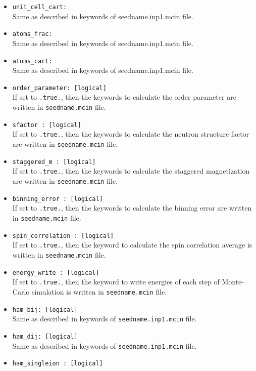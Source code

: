 \documentclass[10pt]{report}
\begin{document}
\begin{itemize}
\item {\tt unit\_cell\_cart: }               \\
Same as described in keywords of seedname.inp1.mcin file.
\item {\tt atoms\_frac: }                      \\
Same as described in keywords of seedname.inp1.mcin file.
\item {\tt atoms\_cart: }                      \\
Same as described in keywords of seedname.inp1.mcin file.
\item {\tt order\_parameter: [logical]}  \\
If set to {\tt .true.}, then the keywords to calculate the order parameter
 are written in {\tt seedname.mcin} file.
\item {\tt sfactor : [logical]}\\
If set to {\tt .true.}, then the keywords to calculate the neutron structure factor        
 are written in {\tt seedname.mcin} file.
\item {\tt staggered\_m : [logical]}\\
If set to {\tt .true.}, then the keywords to calculate the staggered magnetization
 are written in {\tt seedname.mcin} file.
\item {\tt binning\_error : [logical]}\\
If set to {\tt .true.}, then the keywords to calculate the binning error
 are written in {\tt seedname.mcin} file.
\item {\tt spin\_correlation : [logical]}\\
If set to {\tt .true.}, then the keyword to calculate the spin correlation average
 is written in {\tt seedname.mcin} file.
\item {\tt energy\_write : [logical]}\\
If set to {\tt .true.}, then the keyword to write energies of each step of Monte-Carlo simulation
 is written in {\tt seedname.mcin} file.
\item {\tt ham\_bij: [logical]}                      \\
Same as described in keywords of {\tt seedname.inp1.mcin} file.
\item {\tt ham\_dij: [logical]}                      \\
Same as described in keywords of {\tt seedname.inp1.mcin} file.
\item {\tt ham\_singleion : [logical]}\\

\end{itemize}
\end{document}

